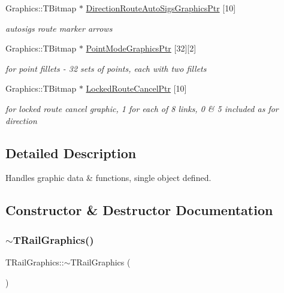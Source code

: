 \begin{DoxyCompactItemize}
Graphics\+::\+T\+Bitmap $\ast$ \mbox{\hyperlink{class_t_rail_graphics_ab0775db98387eb5c22ba0b1f4daa8efe}{Direction\+Route\+Auto\+Sigs\+Graphics\+Ptr}} \mbox{[}10\mbox{]}
\begin{DoxyCompactList}\small\item\em autosigs route marker arrows \end{DoxyCompactList}\item 
\mbox{\label{class_t_rail_graphics_a962b7f59eb1abaa7f80989e783e3f02a}} 
Graphics\+::\+T\+Bitmap $\ast$ \mbox{\hyperlink{class_t_rail_graphics_a962b7f59eb1abaa7f80989e783e3f02a}{Point\+Mode\+Graphics\+Ptr}} \mbox{[}32\mbox{]}\mbox{[}2\mbox{]}
\begin{DoxyCompactList}\small\item\em for point fillets -\/ 32 sets of points, each with two fillets \end{DoxyCompactList}\item 
\mbox{\label{class_t_rail_graphics_a10379722f35b86436020ca874744c339}} 
Graphics\+::\+T\+Bitmap $\ast$ \mbox{\hyperlink{class_t_rail_graphics_a10379722f35b86436020ca874744c339}{Locked\+Route\+Cancel\+Ptr}} \mbox{[}10\mbox{]}
\begin{DoxyCompactList}\small\item\em for locked route cancel graphic, 1 for each of 8 links, 0 \& 5 included as for direction \end{DoxyCompactList}\end{DoxyCompactItemize}


\subsection{Detailed Description}
Handles graphic data \& functions, single object defined. 

\subsection{Constructor \& Destructor Documentation}
\mbox{\label{class_t_rail_graphics_ad243415e657236ecca97fa1d064cf127}} 
\subsubsection{\texorpdfstring{$\sim$\+T\+Rail\+Graphics()}{~TRailGraphics()}}
{\footnotesize\ttfamily T\+Rail\+Graphics\+::$\sim$\+T\+Rail\+Graphics (\begin{DoxyParamCaption}{ }\end{DoxyParamCaption})}

